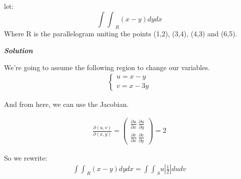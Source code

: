 \documentclass[11pt,fleqn]{book} %
\begin{document}
\begin{example}
    let:
    $${\int\int}_{R} (x-y) dydx$$
    Where R is the parallelogram uniting the points (1,2), (3,4), (4,3) and (6,5).

    \textbf{\textit{Solution}}

    We're going to assume the following region to change our variables.
    \begin{gather}
        \begin{cases}
            u = x-y \\ v = x-3y
        \end{cases}
    \end{gather}

    And from here, we can use the Jacobian.

    \begin{gather}
        \frac{\partial(u,v)}{\partial(x,y)} = \begin{pmatrix}
            \frac{\partial u}{\partial x} \ \frac{\partial u}{\partial y}\\
            \frac{\partial v}{\partial x} \ \frac{\partial v}{\partial y}
        \end{pmatrix} = 2
    \end{gather}

    So we rewrite:
    \begin{gather}
        {\int\int}_R (x-y) dydx = {\int\int}_S u | \frac{1}{2} | dudv
    \end{gather}
\end{example}
\end{document}
